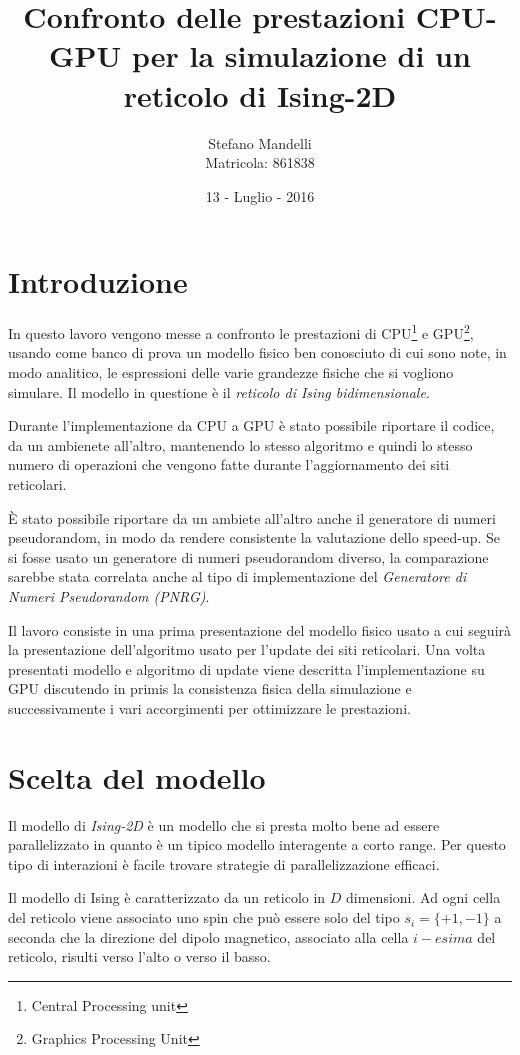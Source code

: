 \documentclass[a4paper,12pt]{article}
\begin{document}
\author{Stefano Mandelli\\
Matricola: 861838}
\title{\bf \Huge Confronto delle prestazioni CPU-GPU per la simulazione di un reticolo di Ising-2D}
\date{13 - Luglio - 2016}
\maketitle
\section*{Introduzione}
In questo lavoro vengono messe a confronto le prestazioni di CPU\footnote{Central Processing unit} e GPU\footnote{Graphics Processing Unit}, usando come banco di prova un modello fisico ben conosciuto di cui sono note, in modo analitico, le espressioni delle varie grandezze fisiche che si vogliono simulare. Il modello in questione \`e il \emph{reticolo di Ising bidimensionale}. 

Durante l'implementazione da CPU a GPU \`e stato possibile riportare il codice, da un ambienete all'altro, mantenendo lo stesso algoritmo e quindi lo stesso numero di operazioni che vengono fatte durante l'aggiornamento dei siti reticolari.

\`E stato possibile riportare da un ambiete all'altro anche il generatore di numeri pseudorandom, in modo da rendere consistente la valutazione dello speed-up. Se si fosse usato un generatore di numeri pseudorandom diverso, la comparazione sarebbe stata correlata anche al tipo di implementazione del \emph{Generatore di Numeri Pseudorandom (PNRG)}. 

Il lavoro consiste in una prima presentazione del modello fisico usato a cui seguir\`a la presentazione dell'algoritmo usato per l'update dei siti reticolari. Una volta presentati modello e algoritmo di update viene descritta l'implementazione su GPU discutendo in primis la consistenza fisica della simulazione e successivamente i vari accorgimenti per ottimizzare le prestazioni.


\section{Scelta del modello}
Il modello di \emph{Ising-2D} è un modello che si presta molto bene ad essere parallelizzato in quanto è un tipico modello interagente a corto range. Per questo tipo di interazioni \`e facile trovare strategie di parallelizzazione efficaci.

Il modello di Ising è caratterizzato da un reticolo in $D$ dimensioni. Ad ogni cella del reticolo viene associato uno spin che può essere solo del tipo $s_i=\lbrace +1, -1 \rbrace$ a seconda che la direzione del dipolo magnetico, associato alla cella $i-esima$ del reticolo, risulti verso l'alto o verso il basso. 
\end{document}
